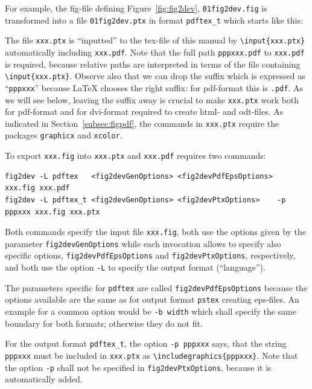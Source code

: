 \documentclass[12pt]{article}
\begin{document}
For example, the fig-file defining Figure~\ref{fig:fig2dev}, 
{\tt 01fig2dev.fig} is transformed into a file  {\tt 01fig2dev.ptx} 
in format {\tt pdftex\_t} which starts like this: 
%
\lstset{language=tex, breaklines, basicstyle=\small}


The file {\tt xxx.ptx} is ``inputted'' to the tex-file of this manual 
by {\tt\textbackslash input\{xxx.ptx\}} 
automatically including {\tt xxx.pdf}. 
Note that the full path {\tt pppxxx.pdf} to {\tt xxx.pdf} is required, 
because relative paths are interpreted in terms of the file 
containing {\tt\textbackslash input\{xxx.ptx\}}. 
Observe also that we can drop the suffix which is expressed as ``{\tt pppxxx}'' 
because \LaTeX{} chooses the right suffix: 
for pdf-format this is {\tt.pdf}. 
As we will see below, 
leaving the suffix away is crucial to make {\tt xxx.ptx} work 
both for pdf-format and for dvi-format required to create html- and odt-files. 
As indicated in Section~\ref{subsec:figpdf}, 
the commands in {\tt xxx.ptx} 
require the packages {\tt graphicx} and {\tt xcolor}. 

To export {\tt xxx.fig} into {\tt xxx.ptx} and {\tt xxx.pdf} 
requires two commands: 
%
\begin{Verbatim}[fontsize=\scriptsize]
fig2dev -L pdftex   <fig2devGenOptions> <fig2devPdfEpsOptions>           xxx.fig xxx.pdf   
fig2dev -L pdftex_t <fig2devGenOptions> <fig2devPtxOptions>    -p pppxxx xxx.fig xxx.ptx
\end{Verbatim}
%
Both commands specify the input file {\tt xxx.fig}, 
both use the options given by the parameter {\tt fig2devGenOptions} 
while each invocation allows to specify also specific options, 
{\tt fig2devPdfEpsOptions} and {\tt fig2devPtxOptions}, respectively, 
and both use the option {\tt -L} to specify the output format (``language''). 


The parameters specific for {\tt pdftex} are called {\tt fig2devPdfEpsOptions} 
because the options available are the same 
as for output format {\tt pstex} creating eps-files. 
An example for a common option would be {\tt -b width} 
which shall specify the same boundary for both formats; 
otherwise they do not fit. 

For the output format {\tt pdftex\_t}, 
the option {\tt -p pppxxx} says, 
that the string {\tt pppxxx} must be included in {\tt xxx.ptx} 
as {\tt\textbackslash includegraphics\{pppxxx\}}. 
Note that the option {\tt-p} shall not be specified 
in {\tt fig2devPtxOptions}, because it is automatically added. 
\end{document}
